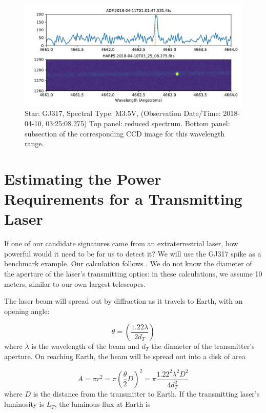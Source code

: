 \documentclass[twocolumn]{aastex701}
\begin{document}
\begin{figure}
    \centering  \includegraphics[width=\textwidth]{clean-figures/seti_candidate_GJ317.pdf}
    \caption{Star: GJ317, Spectral Type: M3.5V, (Observation Date/Time: 2018-04-10, 03:25:08.275) Top panel: reduced spectrum. Bottom panel: subsection of the corresponding CCD image for this wavelength range.}
    \label{fig:seti_candidate_GJ317}
\end{figure}

\section{Estimating the Power Requirements for a Transmitting Laser}
If one of our candidate signatures came from an extraterrestrial laser, how powerful would it need to be for us to detect it?  We will use the GJ317 spike as a benchmark example.  Our calculation follows \cite{Lipman_2019}.  We do not know the diameter of the aperture of the laser's transmitting optics: in these calculations, we assume 10 meters, similar to our own largest telescopes.

The laser beam will spread out by diffraction as it travels to Earth, with an opening angle:

\begin{equation}
    \theta = (\frac{1.22\lambda}{2d_T})
\end{equation}
where $\lambda$ is the wavelength of the beam and $d_T$ the diameter of the transmitter's aperture.  On reaching Earth, the beam will be spread out into a disk of area

\begin{equation}
    A = \pi r^2 = \pi (\frac{\theta}{2} D)^2 = \pi \frac{1.22^2 \lambda^2 D^2}{4 d_T^2}
\end{equation}
where $D$ is the distance from the transmitter to Earth.  If the transmitting laser's luminosity is $L_T$, the luminous flux at Earth is
\end{document}
